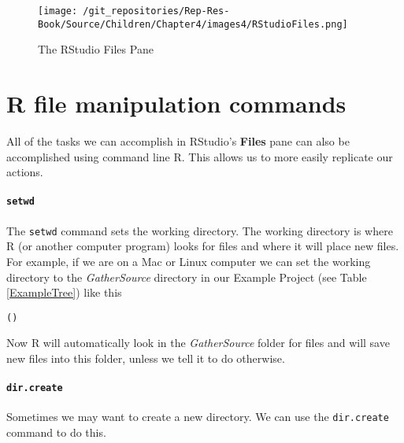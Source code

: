\begin{figure}[t!]
    \caption{The RStudio Files Pane} %
    \label{FilesPane}
        \begin{center}    
        \texttt{[image: /git\_repositories/Rep-Res-Book/Source/Children/Chapter4/images4/RStudioFiles.png]}
        \end{center}
\end{figure}

\section{R file manipulation commands}

All of the tasks we can accomplish in RStudio's {\bf{Files}} pane can also be accomplished using command line R. This allows us to more easily replicate our actions. 

\paragraph{{\tt{setwd}}}

The {\tt{setwd}} command sets the working directory. The working directory is where R (or another computer program) looks for files and where it will place new files. For example, if we are on a Mac or Linux computer we can set the working directory to the {\emph{GatherSource}} directory in our Example Project (see Table \ref{ExampleTree}) like this

\begin{knitrout}
\color{fgcolor}\begin{kframe}
\begin{alltt}
()
\end{alltt}
\end{kframe}
\end{knitrout}


\noindent Now R will automatically look in the {\emph{GatherSource}} folder for files and will save new files into this folder, unless we tell it to do otherwise.

\paragraph{{\tt{dir.create}}}

Sometimes we may want to create a new directory. We can use the {\tt{dir.create}} command to do this.

